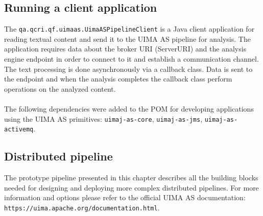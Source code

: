 \documentclass{wileysev}
\begin{document}
\subsection{Running a client application}
The \texttt{qa.qcri.qf.uimaas.UimaASPipelineClient} is a Java client application for reading textual content and send it to the UIMA AS pipeline for analysis. The application requires data about the broker URI (ServerURI) and the analysis engine endpoint in order to connect to it and establish a communication channel. The text processing is done asynchronously via a callback class. Data is sent to the endpoint and when the analysis completes the callback class perform operations on the analyzed content. 
\\\\
The following dependencies were added to the POM for developing applications using the UIMA AS primitives: \texttt{uimaj-as-core}, \texttt{uimaj-as-jms}, \texttt{uimaj-as-activemq}.

\subsection{Distributed pipeline}
The prototype pipeline presented in this chapter describes all the building blocks needed for designing and deploying more complex distributed pipelines. For more information and options please refer to the official UIMA AS documentation:\\ \texttt{https://uima.apache.org/documentation.html}.





\end{document}
